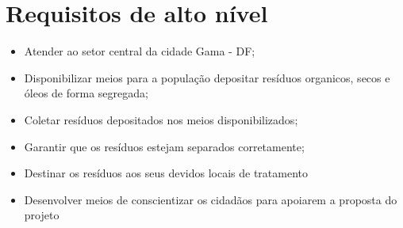 \section{Requisitos de alto nível}

    \begin{itemize}
      \item Atender ao setor central da cidade Gama - DF;
      \item Disponibilizar meios para a população depositar resíduos organicos, secos e óleos de forma segregada;
      \item Coletar resíduos depositados nos meios disponibilizados;
      \item Garantir que os resíduos estejam separados corretamente;
      \item Destinar os resíduos aos seus devidos locais de tratamento
      \item Desenvolver meios de conscientizar os cidadãos para apoiarem a proposta do projeto
    \end{itemize}

